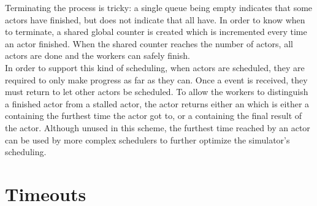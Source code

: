 Terminating the process is tricky: a single queue being empty indicates that some actors have finished, but does not indicate that all have.
In order to know when to terminate, a shared global counter is created which is incremented every time an actor finished.
When the shared counter reaches the number of actors, all actors are done and the workers can safely finish.
\\

In order to support this kind of scheduling, when actors are scheduled, they are required to only make progress as far as they can.
Once a  event is received, they must return to let other actors be scheduled.
To allow the workers to distinguish a finished actor from a stalled actor, the actor returns either an  which is either a  containing the furthest time the actor got to, or a  containing the final result of the actor.
Although unused in this scheme, the furthest time reached by an actor can be used by more complex schedulers to further optimize the simulator's scheduling.

\section{Timeouts} \label{sim-timeouts}